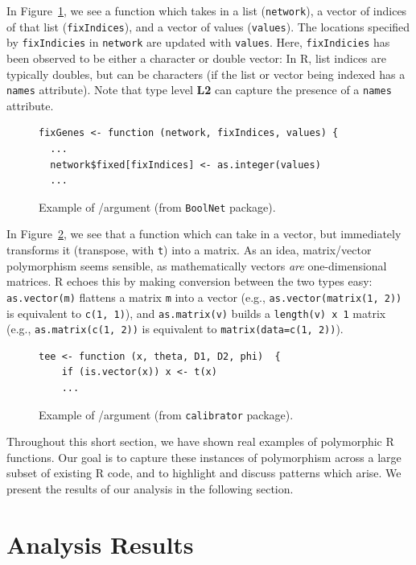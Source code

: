 \documentclass[acmsmall,10pt,review,anonymous]{acmart}\settopmatter{printfolios=true,printccs=false,printacmref=false}
\newcommand{\code}[1]{\lstinline|#1|\xspace}
\begin{document}
In Figure~\ref{fig:chardbl}, we see a function which takes in a list ({\tt network}), a vector of indices of that list ({\tt fixIndices}), and a
vector of values ({\tt values}).  The locations specified by {\tt fixIndicies} in {\tt network} are updated with {\tt values}.  Here, {\tt fixIndicies} has been observed to be either a character or double vector:
In R, list indices are typically doubles, but can be characters (if the list
or vector being indexed has a {\tt names} attribute).
Note that type level {\bf L2} can capture the presence of a {\tt names} attribute.

\begin{figure}[!hb]{\small\begin{lstlisting}[style=R]
fixGenes <- function (network, fixIndices, values) {
  ...
  network$fixed[fixIndices] <- as.integer(values)
  ...
\end{lstlisting}}\caption{Example of \C/\D argument (from {\tt BoolNet} package).}\label{fig:chardbl}\end{figure}

In Figure~\ref{fig:matvec}, we see that a function which can take in a vector,
but immediately transforms it (transpose, with {\tt t}) into a matrix.  As
an idea, matrix/vector polymorphism seems sensible, as mathematically
vectors {\it are} one-dimensional matrices.  R echoes this by making conversion between the two
types easy: \code{as.vector(m)} flattens a matrix \code{m} into a vector
(e.g., \code{as.vector(matrix(1, 2))} is equivalent to \code{c(1, 1)}), and
\code{as.matrix(v)} builds a {\tt length(v) x 1} matrix (e.g.,
\code{as.matrix(c(1, 2))} is equivalent to \code{matrix(data=c(1, 2))}). 
  
\begin{figure}[!hb]{\small\begin{lstlisting}[style=R]
tee <- function (x, theta, D1, D2, phi)  {
    if (is.vector(x)) x <- t(x)
    ...
\end{lstlisting}}\caption{Example of /\D argument (from {\tt calibrator} package).}\label{fig:matvec}\end{figure}

Throughout this short section, we have shown real examples of polymorphic R functions.
Our goal is to capture these instances of polymorphism across a large subset of existing R code, and to highlight and discuss patterns which arise.
We present the results of our analysis in the following section.

%
%
%
%
%
%
\section{Analysis Results}\label{sec:results}
\end{document}
